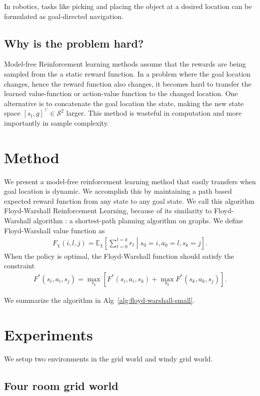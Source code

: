 \documentclass[letterpaper]{article} %
\def\state{s}
\def\act{a}
\def\State{\mathcal{S}}
\def\rew{r}
\def\E{\mathbb{E}}
\newcommand{\policy}{\chi}
\newcommand{\fwcost}{F}
\newcommand{\goal}{g}
\begin{document}
In robotics, tasks like picking and placing the object at a desired location can be
formulated as goal-directed navigation.

\subsection{Why is the problem hard?}
Model-free Reinforcement learning methods assume that the rewards are being sampled
from the a static reward function.
In a problem where the goal location changes, hence the reward function also changes,
it becomes hard to transfer the learned value-function or action-value function to
the changed location.
One alternative is to concatenate the goal location the state, making the new state space
$[\state_t, \goal]^\top \in \State^2$ larger.
This method is wasteful in computation and more importantly in sample complexity.

\section{Method}
We present a model-free reinforcement learning method that easily transfers when goal
location is dynamic.
We accomplish this by maintaining a path based expected reward function from any state to any goal state.
We call this algorithm Floyd-Warshall Reinforcement Learning, because of its
similarity to Floyd-Warshall algorithm : a shortest-path planning algorithm on graphs.
We define Floyd-Warshall value function as
%
\begin{align}
\fwcost_{\policy}(i, l,  j) =
\E_{\policy}\left[ \sum_{t=0}^{t=k} \rew_t \middle\vert \state_0 = i, \act_0 = l, \state_k = j \right] .
\end{align}%
%
When the policy is optimal, the Floyd-Warshall function should satisfy the constraint
%
\begin{align}
\fwcost^*(\state_i, \act_i, \state_j) = \max_{\state_k} \left[
\fwcost^*(\state_i, \act_i, \state_k)
+ \max_{\act_k}\fwcost^*(\state_k, \act_k, \state_j) \right] .
\end{align}%
%

We summarize the algorithm in Alg~\ref{alg:floyd-warshall-small}.

\section{Experiments}
We setup two environments in the grid world and windy grid world.
\subsection{Four room grid world}
\end{document}
